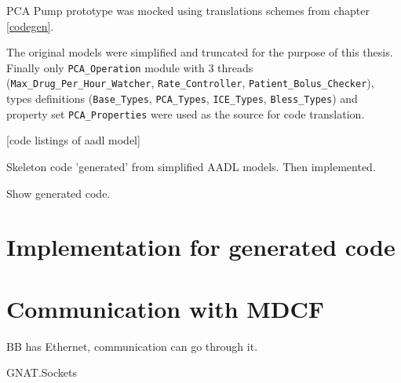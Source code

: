 PCA Pump prototype was mocked using translations schemes from chapter \ref{codegen}.

The original models were simplified and truncated for the purpose of this thesis. Finally only \lstinline{PCA_Operation} module with 3 threads (\lstinline{Max_Drug_Per_Hour_Watcher}, \lstinline{Rate_Controller}, \lstinline{Patient_Bolus_Checker}), types definitions (\lstinline{Base_Types}, \lstinline{PCA_Types}, \lstinline{ICE_Types}, \lstinline{Bless_Types}) and property set \lstinline{PCA_Properties} were used as the source for code translation.

[code listings of aadl model]


Skeleton code 'generated' from simplified AADL models. Then implemented.

Show generated code.



\section{Implementation for generated code}
\label{pcapumpimpl:codegenimpl}




\section{Communication with MDCF}
\label{pcapumpimpl:mdcf}

BB has Ethernet, communication can go through it.

GNAT.Sockets


